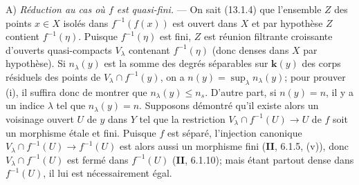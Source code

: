 A) \emph{Réduction au cas où $f$ est quasi-fini.} --- On sait (13.1.4) que l'ensemble $Z$ des points $x\in X$ isolés dans $f^{-1}(f(x))$ est ouvert dans $X$ et par hypothèse $Z$ contient $f^{-1}(\eta)$. Puisque $f^{-1}(\eta)$ est fini, $Z$ est réunion filtrante croissante d'ouverts quasi-compacts $V_\lambda$ contenant $f^{-1}(\eta)$ (donc denses dans $X$ par hypothèse). Si $n_\lambda(y)$ est la somme des degrés séparables sur $\boldsymbol{k}(y)$ des corps résiduels des points de $V_\lambda\cap f^{-1}(y)$, on a $n(y)=\sup_\lambda n_\lambda(y)$; pour prouver (i), il suffira donc de montrer que $n_\lambda(y)\leq n_s$. D'autre part, si $n(y)=n$, il y a un indice $\lambda$ tel que $n_\lambda(y)=n$. Supposons démontré qu'il existe alors un voisinage ouvert $U$ de $y$ dans $Y$ tel que la restriction $V_\lambda\cap f^{-1}(U)\to U$ de $f$ soit un morphisme étale et fini. Puisque $f$ est séparé, l'injection canonique $V_\lambda\cap f^{-1}(U)\to f^{-1}(U)$ est alors aussi un morphisme fini (\textbf{II}, 6.1.5, (v)), donc $V_\lambda\cap f^{-1}(U)$ est fermé dans $f^{-1}(U)$ (\textbf{II}, 6.1.10); mais étant partout dense dans $f^{-1}(U)$, il lui est nécessairement égal.

